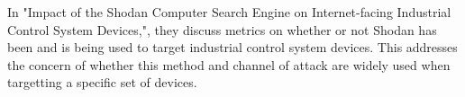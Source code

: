 



In "Impact of the Shodan Computer Search Engine on Internet-facing Industrial
Control System Devices,"\cite{afit//CSAR-10-025-01}, they discuss metrics
on whether or not Shodan has been and is being used to target industrial control
system devices. This addresses the concern of whether this method and channel of
attack are widely used when targetting a specific set of devices.
